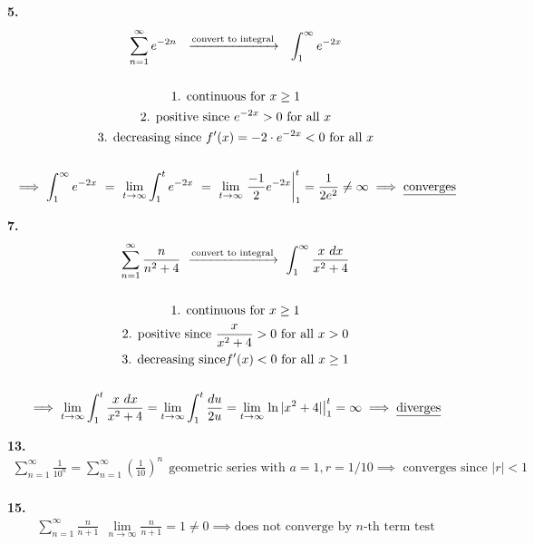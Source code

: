 \documentclass{article}
\begin{document}
\newpage

\noindent
\textbf{
5.
}
\\
\begin{gather*}
\sum_{n=1}^{\infty} e^{-2n}
~~\xrightarrow{\text{convert to integral}}~~
\int_{1}^{\infty} e^{-2x}
\\
\\
\text{1. continuous for } x \geq 1
\\
\text{2. positive since } e^{-2x} > 0 \text{ for all } x
\\
\text{3. decreasing since }
f'(x)=-2\cdot e^{-2x} < 0 \text{ for all } x
\\
\\
\implies
\int_{1}^{\infty} e^{-2x}
~=~
\lim_{t \to \infty}
\int_{1}^t e^{-2x}
~=~
\lim_{t \to \infty}
\left. \frac{-1}{2} e^{-2x} \right|_1^t=\frac{1}{2e^2} \neq \infty
\implies \text{\underline{converges}}
\\
\end{gather*}

\noindent
\textbf{
7.
}
\\
\begin{gather*}
\sum_{n=1}^{\infty} \frac{n}{n^2+4}
~\xrightarrow{\text{convert to integral}}~
\int_1^{\infty} \frac{x~dx}{x^2+4}
\\
\\
\text{1. continuous for } x \geq 1
\\
\text{2. positive since } \frac{x}{x^2+4} > 0 \text{ for all } x > 0
\\
\text{3. decreasing since} f'(x)<0 \text{ for all } x \geq 1
\\
\\
\implies
\lim_{t \to \infty} 
\int_1^t \frac{x~dx}{x^2+4}
=
\lim_{t \to \infty} 
\int_1^t \frac{du}{2u}
=
\lim_{t \to \infty}
\left. \ln|x^2+4| \right|_1^t=\infty
\implies \text{\underline{diverges}}
\\
\end{gather*}

\noindent
\textbf{
13.
}
\\
\begin{gather*}
\sum_{n=1}^{\infty} \frac{1}{10^n}
=\sum_{n=1}^{\infty} \left(\frac{1}{10}\right)^n
~~\text{geometric series with } a=1, r=1/10 \implies \text{ converges since } |r|<1
\\
\end{gather*}

\noindent
\textbf{
15.
}
\\
\begin{gather*}
\sum_{n=1}^{\infty} \frac{n}{n+1}
~~
\lim_{n \to \infty} \frac{n}{n+1}=1 \neq 0
\implies \text{does not converge by $n$-th term test}
\\
\end{gather*}
\end{document}
